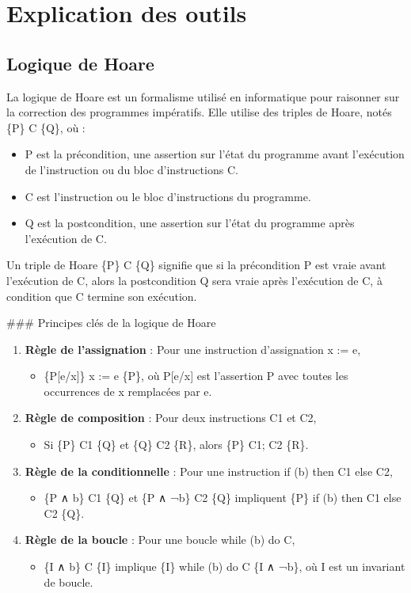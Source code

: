\documentclass[11pt]{article}
\begin{document}
\section{Explication des outils}
\label{sec:org1acbde8}

\subsection{Logique de Hoare}
\label{sec:org7d71c98}
La logique de Hoare est un formalisme utilisé en informatique pour raisonner sur la correction des programmes impératifs. Elle utilise des triples de Hoare, notés \{P\} C \{Q\}, où :

\begin{itemize}
\item P est la précondition, une assertion sur l'état du programme avant l'exécution de l'instruction ou du bloc d'instructions C.
\item C est l'instruction ou le bloc d'instructions du programme.
\item Q est la postcondition, une assertion sur l'état du programme après l'exécution de C.
\end{itemize}

Un triple de Hoare \{P\} C \{Q\} signifie que si la précondition P est vraie avant l'exécution de C, alors la postcondition Q sera vraie après l'exécution de C, à condition que C termine son exécution.

\#\#\# Principes clés de la logique de Hoare
\begin{enumerate}
\item \textbf{\textbf{Règle de l'assignation}} : Pour une instruction d'assignation x := e,
\begin{itemize}
\item \{P[e/x]\} x := e \{P\}, où P[e/x] est l'assertion P avec toutes les occurrences de x remplacées par e.
\end{itemize}

\item \textbf{\textbf{Règle de composition}} : Pour deux instructions C1 et C2,
\begin{itemize}
\item Si \{P\} C1 \{Q\} et \{Q\} C2 \{R\}, alors \{P\} C1; C2 \{R\}.
\end{itemize}

\item \textbf{\textbf{Règle de la conditionnelle}} : Pour une instruction if (b) then C1 else C2,
\begin{itemize}
\item \{P ∧ b\} C1 \{Q\} et \{P ∧ ¬b\} C2 \{Q\} impliquent \{P\} if (b) then C1 else C2 \{Q\}.
\end{itemize}

\item \textbf{\textbf{Règle de la boucle}} : Pour une boucle while (b) do C,
\begin{itemize}
\item \{I ∧ b\} C \{I\} implique \{I\} while (b) do C \{I ∧ ¬b\}, où I est un invariant de boucle.
\end{itemize}
\end{enumerate}
\end{document}

